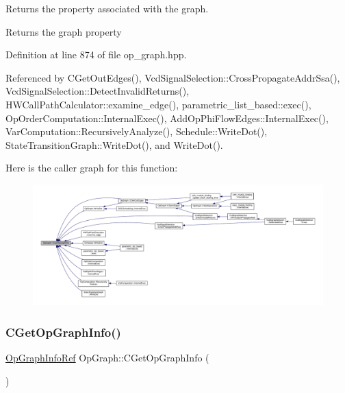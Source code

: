 Returns the property associated with the graph. 

\begin{DoxyReturn}{Returns}
the graph property 
\end{DoxyReturn}


Definition at line 874 of file op\+\_\+graph.\+hpp.



Referenced by C\+Get\+Out\+Edges(), Vcd\+Signal\+Selection\+::\+Cross\+Propagate\+Addr\+Ssa(), Vcd\+Signal\+Selection\+::\+Detect\+Invalid\+Returns(), H\+W\+Call\+Path\+Calculator\+::examine\+\_\+edge(), parametric\+\_\+list\+\_\+based\+::exec(), Op\+Order\+Computation\+::\+Internal\+Exec(), Add\+Op\+Phi\+Flow\+Edges\+::\+Internal\+Exec(), Var\+Computation\+::\+Recursively\+Analyze(), Schedule\+::\+Write\+Dot(), State\+Transition\+Graph\+::\+Write\+Dot(), and Write\+Dot().

Here is the caller graph for this function\+:
\nopagebreak
\begin{figure}[H]
\begin{center}
\leavevmode
\includegraphics[width=350pt]{d6/d79/structOpGraph_a3f8d3d26ce28f7663105445996fc8fb8_icgraph}
\end{center}
\end{figure}
\mbox{\label{structOpGraph_ad3c791977bb1c328a3c24cdfecc2d415}} 
\subsubsection{\texorpdfstring{C\+Get\+Op\+Graph\+Info()}{CGetOpGraphInfo()}\hspace{0.1cm}{\footnotesize\ttfamily [2/2]}}
{\footnotesize\ttfamily \hyperlink{op__graph_8hpp_aa53452ee6eef48921379dd17cb659724}{Op\+Graph\+Info\+Ref} Op\+Graph\+::\+C\+Get\+Op\+Graph\+Info (\begin{DoxyParamCaption}{ }\end{DoxyParamCaption})\hspace{0.3cm}{\ttfamily [inline]}}



